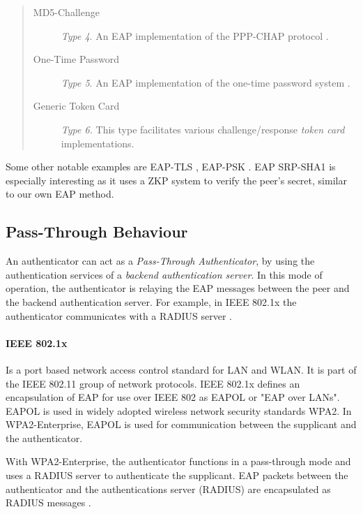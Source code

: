\begin{quote}
\begin{description}
	\item[MD5-Challenge] \textit{Type 4}. An EAP implementation of the PPP-CHAP protocol \cite{simon2008eap}.
	\item[One-Time Password] \textit{Type 5}. An EAP implementation of the one-time password system \cite{haller1998one}.
	\item[Generic Token Card] \textit{Type 6.} This type facilitates various challenge/response \textit{token card} implementations.
\end{description}
\end{quote}

Some other notable examples are EAP-TLS \cite{simon2008eap}, EAP-PSK \cite{bersani2007eap}.
EAP SRP-SHA1 \cite{ietf-pppext-eap-srp-03} is especially interesting as it uses a ZKP system to verify the peer's secret, similar to our own EAP method.

\subsection{Pass-Through Behaviour}
An authenticator can act as a \textit{Pass-Through Authenticator}, by using the authentication services of a \textit{backend authentication server}.
In this mode of operation, the authenticator is relaying the EAP messages between the peer and the backend authentication server.
For example, in IEEE 802.1x the authenticator communicates with a RADIUS server \cite{congdon2003ieee}.

\paragraph{IEEE 802.1x}

Is a port based network access control standard for LAN and WLAN.
It is part of the IEEE 802.11 group of network protocols.
IEEE 802.1x defines an encapsulation of EAP for use over IEEE 802 as EAPOL or "EAP over LANs".
EAPOL is used in widely adopted wireless network security standards WPA2. 
In WPA2-Enterprise, EAPOL is used for communication between the supplicant and the authenticator.

With WPA2-Enterprise, the authenticator functions in a pass-through mode and uses a RADIUS server to authenticate the supplicant.
EAP packets between the authenticator and the authentications server (RADIUS) are encapsulated as RADIUS messages \cite{aboba2003radius, chen2005extensible, congdon2003ieee}.

